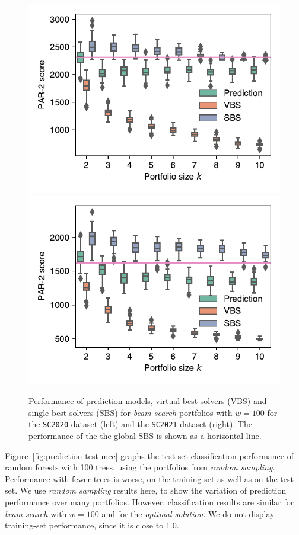 \documentclass[conference]{IEEEtran}
\begin{document}
\begin{figure}[t]
	\centering
	\includegraphics[width=0.9\columnwidth, trim=0 15 0 10, clip]{plots/prediction-test-objective-beam-2020.pdf}
	\qquad
	\includegraphics[width=0.9\columnwidth, trim=0 15 0 10, clip]{plots/prediction-test-objective-beam-2021.pdf}
	\caption{
		Performance of prediction models, virtual best solvers (VBS) and single best solvers (SBS) for \emph{beam search} portfolios with $w=100$ for the \texttt{SC2020} dataset (left) and the \texttt{SC2021} dataset (right). 
		The performance of the the global SBS is shown as a horizontal line.
	}
	\label{fig:prediction-test-objective-beam}
\end{figure}

Figure~\ref{fig:prediction-test-mcc} graphs the test-set classification performance of random forests with 100 trees, using the portfolios from \emph{random sampling}.
Performance with fewer trees is worse, on the training set as well as on the test set.
We use \emph{random sampling} results here, to show the variation of prediction performance over many portfolios.
However, classification results are similar for \emph{beam search} with $w=100$ and for the \emph{optimal solution}.
We do not display training-set performance, since it is close to 1.0.
\end{document}
